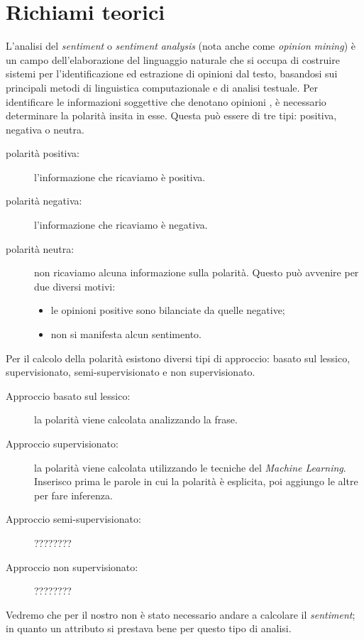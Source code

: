 \chapter{Richiami teorici}
	L'analisi del \textit{sentiment} o \textit{sentiment} \textit{analysis} (nota anche come \textit{opinion} \textit{mining}) è un campo dell'elaborazione del linguaggio naturale che si occupa di costruire sistemi per l'identificazione ed estrazione di opinioni dal testo, basandosi sui principali metodi di linguistica computazionale e di analisi testuale. Per identificare le informazioni soggettive che denotano opinioni , è necessario determinare la polarità insita in esse. Questa può essere di tre tipi: positiva, negativa o neutra.
		
	\begin{description}
		\item [polarità positiva:] l'informazione che ricaviamo è positiva.	
		\item [polarità negativa:] l'informazione che ricaviamo è negativa.
		\item [polarità neutra:] non ricaviamo alcuna informazione sulla polarità. Questo può avvenire per due diversi motivi:
			
		\begin{itemize}
			\item le opinioni positive sono bilanciate da quelle negative;
			\item non si manifesta alcun sentimento.
		\end{itemize}
			
	\end{description}
	
	Per il calcolo della polarità esistono diversi tipi di approccio: basato sul lessico, supervisionato, semi-supervisionato e non supervisionato.
		
	\begin{description}
		\item [Approccio basato sul lessico:] la polarità viene calcolata analizzando la frase.
		\item [Approccio supervisionato:] la polarità viene calcolata utilizzando le tecniche del \textit{Machine Learning}. Inserisco prima le parole in cui la polarità è esplicita, poi aggiungo le altre per fare inferenza.
		\item [Approccio semi-supervisionato:] ????????
		\item [Approccio non supervisionato:] ????????	
	\end{description}
		
	Vedremo che per il nostro non è stato necessario andare a calcolare il \textit{sentiment}; in quanto un attributo si prestava bene per questo tipo di analisi.